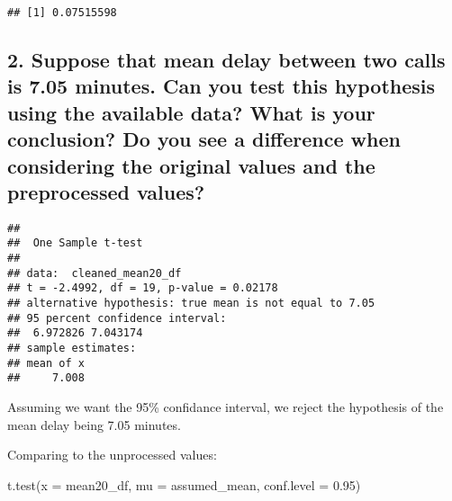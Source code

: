 \documentclass[
]{article}
\newenvironment{Shaded}{\begin{snugshade}}{\end{snugshade}}
\newcommand{\AttributeTok}[1]{\textcolor[rgb]{0.77,0.63,0.00}{#1}}
\newcommand{\FloatTok}[1]{\textcolor[rgb]{0.00,0.00,0.81}{#1}}
\newcommand{\FunctionTok}[1]{\textcolor[rgb]{0.00,0.00,0.00}{#1}}
\newcommand{\NormalTok}[1]{#1}
\newcommand{\OtherTok}[1]{\textcolor[rgb]{0.56,0.35,0.01}{#1}}
\newcommand{\SpecialCharTok}[1]{\textcolor[rgb]{0.00,0.00,0.00}{#1}}
\begin{document}
\begin{verbatim}
## [1] 0.07515598
\end{verbatim}

\newpage

\hypertarget{suppose-that-mean-delay-between-two-calls-is-7.05-minutes.-can-you-test-this-hypothesis-using-the-available-data-what-is-your-conclusion-do-you-see-a-difference-when-considering-the-original-values-and-the-preprocessed-values}{%
\subsection{2. Suppose that mean delay between two calls is 7.05
minutes. Can you test this hypothesis using the available data? What is
your conclusion? Do you see a difference when considering the original
values and the preprocessed
values?}\label{suppose-that-mean-delay-between-two-calls-is-7.05-minutes.-can-you-test-this-hypothesis-using-the-available-data-what-is-your-conclusion-do-you-see-a-difference-when-considering-the-original-values-and-the-preprocessed-values}}

\begin{Shaded}
\end{Shaded}

\begin{verbatim}
## 
##  One Sample t-test
## 
## data:  cleaned_mean20_df
## t = -2.4992, df = 19, p-value = 0.02178
## alternative hypothesis: true mean is not equal to 7.05
## 95 percent confidence interval:
##  6.972826 7.043174
## sample estimates:
## mean of x 
##     7.008
\end{verbatim}

Assuming we want the 95\% confidance interval, we reject the hypothesis
of the mean delay being 7.05 minutes.

Comparing to the unprocessed values:

\begin{Shaded}
\begin{Highlighting}[]
\FunctionTok{t.test}\NormalTok{(}\AttributeTok{x =}\NormalTok{ mean20\_df, }\AttributeTok{mu =}\NormalTok{ assumed\_mean, }\AttributeTok{conf.level =} \FloatTok{0.95}\NormalTok{)}
\end{Highlighting}
\end{Shaded}
\end{document}

